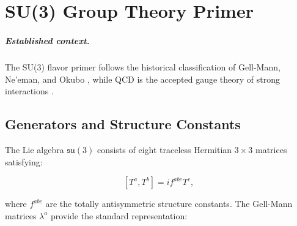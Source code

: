 \chapter{SU(3) Group Theory Primer}
\label{app:su3_primer}


\paragraph{Established context.}
The SU(3) flavor primer follows the historical classification of Gell-Mann,
Ne'eman, and Okubo \cite{gellmann1961,Neeman1961,GellMann1962,okubo1962}, while
QCD is the accepted gauge theory of strong interactions
\cite{GrossWilczek1973,Politzer1973,Wilson1974}.

\section{Generators and Structure Constants}

The Lie algebra $\mathfrak{su}(3)$ consists of eight traceless Hermitian
$3\times 3$ matrices satisfying:

\[
[T^a, T^b] = i f^{abc} T^c,
\]

where $f^{abc}$ are the totally antisymmetric structure constants.
The Gell-Mann matrices $\lambda^a$ provide the standard representation:


